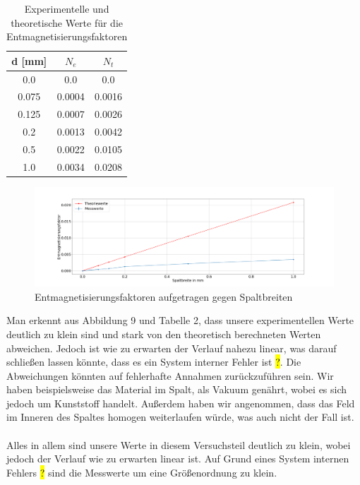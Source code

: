             \begin{table}[H]
                \centering
                \begin{tabular}[]{c|c|c}
                    d [mm] & $N_e$ & $N_t$\\
                    \hline
                    0.0     & 0.0       & 0.0   \\
                    0.075   & 0.0004    & 0.0016\\
                    0.125   & 0.0007    & 0.0026\\
                    0.2     & 0.0013    & 0.0042\\
                    0.5     & 0.0022    & 0.0105\\
                    1.0     & 0.0034    & 0.0208\\
                \end{tabular}
                \caption{Experimentelle und theoretische Werte für die Entmagnetisierungsfaktoren}
            \end{table}
            \begin{figure}[H]
                \centering
                \includegraphics[width=0.8 \textwidth]{Images/Teil4.2_Entmagnetisierungsfakoren.png}
                \caption{Entmagnetisierungsfaktoren aufgetragen gegen Spaltbreiten}
            \end{figure}
            Man erkennt aus Abbildung 9 und Tabelle 2, dass unsere experimentellen Werte deutlich zu klein sind und
            stark von den theoretisch berechneten Werten abweichen. Jedoch ist wie zu erwarten der Verlauf 
            nahezu linear, was darauf schließen lassen könnte, dass es ein System interner Fehler ist \hl{?}.
            Die Abweichungen könnten auf fehlerhafte Annahmen zurückzuführen sein. Wir haben beispielsweise das Material im Spalt,
            als Vakuum genährt, wobei es sich jedoch um Kunststoff handelt. Außerdem haben wir angenommen, dass das Feld 
            im Inneren des Spaltes homogen weiterlaufen würde, was auch nicht der Fall ist.\\
            \\

            Alles in allem sind unsere Werte in diesem Versuchsteil deutlich zu klein, wobei jedoch
            der Verlauf wie zu erwarten linear ist. Auf Grund eines System internen Fehlers \hl{?} sind die Messwerte
            um eine Größenordnung zu klein. 